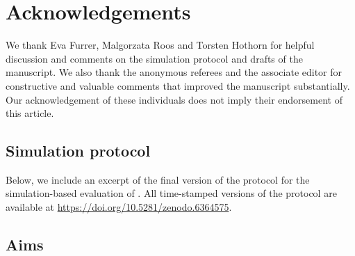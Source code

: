 \section*{Acknowledgements}
We thank Eva Furrer, Malgorzata Roos and Torsten Hothorn for helpful discussion
and comments on the simulation protocol and drafts of the manuscript. We also
thank the anonymous referees and the associate editor for constructive and
valuable comments that improved the manuscript substantially. Our
acknowledgement of these individuals does not imply their endorsement of this
article.

\begin{subappendices}
\renewcommand{\thesection}{\Alph{section}}

\section{Simulation protocol}
\label{app6:protocol}

Below, we include an excerpt of the final version of the protocol for the
simulation-based evaluation of \ainet{}. All time-stamped versions of the
protocol are available at \url{https://doi.org/10.5281/zenodo.6364575}.

\subsection{Aims} \label{sec6:aims}


\end{subappendices}
